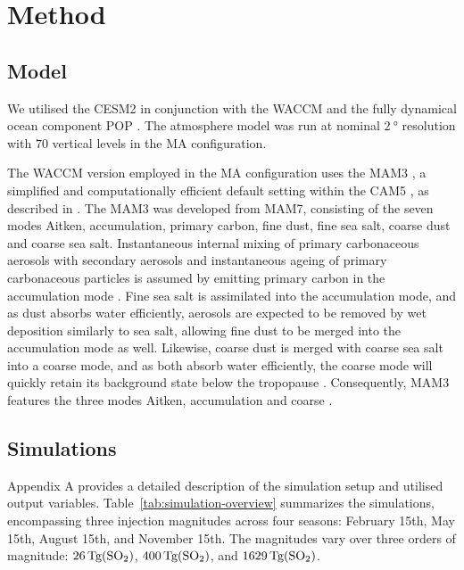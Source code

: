 \documentclass[draft]{agujournal2019}
\begin{document}
\section{Method}\label{sec:method}

\subsection{Model}

We utilised the CESM2 \cite{danabasoglu2020} in conjunction with the WACCM
\cite{gettleman2019} and the fully dynamical ocean component POP
\cite{smith2010, danabasoglu2020}. The atmosphere model was run at nominal
\(\SI{2}{\degree}\) resolution with \(70\) vertical levels in the MA
configuration.

The WACCM version employed in the MA configuration uses the MAM3
\cite{gettleman2019}, a simplified and computationally efficient default setting within
the CAM5 \cite{liu2016}, as described in . The MAM3 was
developed from MAM7, consisting of the seven modes Aitken, accumulation, primary carbon,
fine dust, fine sea salt, coarse dust and coarse sea salt. Instantaneous internal mixing
of primary carbonaceous aerosols with secondary aerosols and instantaneous ageing of
primary carbonaceous particles is assumed by emitting primary carbon in the accumulation
mode \cite{liu2016}. Fine sea salt is assimilated into the accumulation mode, and as
dust absorbs water efficiently, aerosols are expected to be removed by wet deposition
similarly to sea salt, allowing fine dust to be merged into the accumulation mode as
well. Likewise, coarse dust is merged with coarse sea salt into a coarse mode, and as
both absorb water efficiently, the coarse mode will quickly retain its background state
below the tropopause \cite{liu2012}. Consequently, MAM3 features the three modes
Aitken, accumulation and coarse \cite{liu2016}.

\subsection{Simulations}

Appendix A provides a detailed description of the simulation setup and utilised output
variables. Table~\ref{tab:simulation-overview} summarizes the simulations, encompassing
three  injection magnitudes across four seasons: February 15th, May 15th, August
15th, and November 15th. The magnitudes vary over three orders of magnitude:
\(\SI{26}{\tera\gram(\ce{SO2})}\), \(\SI{400}{\tera\gram(\ce{SO2})}\), and
\(\SI{1629}{\tera\gram(\ce{SO2})}\).
\end{document}
